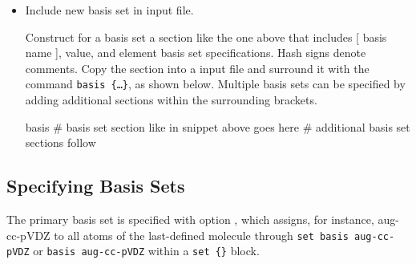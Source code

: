\begin{itemize}
\item Include new basis set in input file.

Construct for a basis set a section like the one above that includes [ basis name ], 
value, and element basis set specifications. Hash signs denote comments.
Copy the section into a \PSIfour input file and surround it with the command \texttt{basis \{\dots\}}, 
as shown below.
Multiple basis sets can be specified by adding additional sections within the surrounding brackets.
\begin{Snippet}
basis {
# basis set section like in snippet above goes here
# additional basis set sections follow
}
\end{Snippet}
\end{itemize}


\subsection{Specifying Basis Sets}

The primary basis set is specified with option , which assigns,
for instance, aug-cc-pVDZ to all atoms of the last-defined molecule through
\texttt{set basis aug-cc-pVDZ} or \texttt{basis aug-cc-pVDZ} within a \texttt{set \{\}} block.




